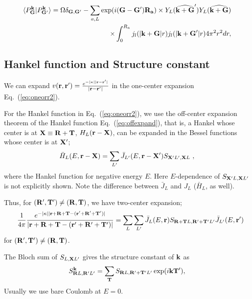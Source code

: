 \documentclass[a4paper,10pt,epsf,fleqn]{article}
\newcommand{\bfk}{{\bf k}}
\newcommand{\bfr}{{\bf r}}
\newcommand{\bfX}{{\bf X}}
\newcommand{\bfT}{{\bf T}}
\newcommand{\bfR}{{\bf R}}
\newcommand{\req}[1]{\mbox{Eq.~(\ref{#1})}}
\begin{document}
\begin{eqnarray}
\langle P^{\bf k}_{\bf G}|P^{\bf k}_{{\bf G}'} \rangle
= \Omega \delta_{{\bf G},{\bf G}'} -  
\sum_{a,L} \exp( i ({\bf G}-{\bf G}') {\bf R_a}) \times Y_L(\widehat{{\bf k+G}}') 
Y_L( {\bf \widehat{ k+G} }) \nonumber \\
\times \int_0^{R_a} j_l(|{\bf k+G}|r)j_l(|{\bf k+G}'|r) 4 \pi^2 r^2 dr,
\end{eqnarray}



\subsection{Hankel function and Structure constant}
We can expand 
$v(\bfr,\bfr')=\frac{e^{-|\kappa||\bfr-\bfr'|}}{|\bfr-\bfr'|}$
in the one-center expansion \req{eq:oneorr2}.

For the Hankel function in \req{eq:oneorr2}, we use
the off-center expansion theorem of the
Hankel function \req{eq:offexpand}, that is, 
a Hankel whose center is at $\bfX\equiv\bfR+\bfT$, $H_L(\bfr-\bfX)$, 
can be expanded in the Bessel functions whose center is at $\bfX'$;
\begin{eqnarray}
\bar{H}_L(E,\bfr-\bfX)=\sum_{L'}\bar{J}_{L'}(E,\bfr-\bfX') S_{\bfX'{L'},\bfX{L}}\ ,
\label{eq:offexpand}
\end{eqnarray}
where the Hankel function for negative energy $E$.
Here $E$-dependence of $S_{\bfX'{L},\bfX{L'}}$ is not explicitly shown. 
Note the difference between $\bar{J}_L$ and $J_L$ ($\bar{H}_L$, as well).

Thus, for $(\bfR',\bfT')\neq(\bfR,\bfT)$, 
we have two-center expansion;
\begin{eqnarray}
&&
\frac{1}{4\pi} \frac{e^{-|\kappa||\bfr+\bfR+\bfT-(\bfr'+\bfR'+\bfT')|}}
{|\bfr+\bfR+\bfT-(\bfr'+\bfR'+\bfT')|}
= \sum_L \sum_{L'}
{\bar{J}_L(E,\bfr)}
S_{\bfR+\bfT{L},\bfR'+\bfT'{L'}} {\bar{J}_{L'}(E,\bfr')} 
\label{eq:vtwoc}
\end{eqnarray}
for $(\bfR',\bfT')\neq(\bfR,\bfT)$. 

The Bloch sum of $S_{{L},\bfX{L'}}$
gives the structure constant of $\bfk$ as
\begin{eqnarray}
S^\bfk_{\bfR{L},\bfR'{L'}}=
\sum_\bfT S_{\bfR{L},\bfR'+\bfT'{L'}}\exp(i \bfk\bfT'),
\end{eqnarray}
Usually 
we use bare Coulomb at $E=0$.
\end{document}
